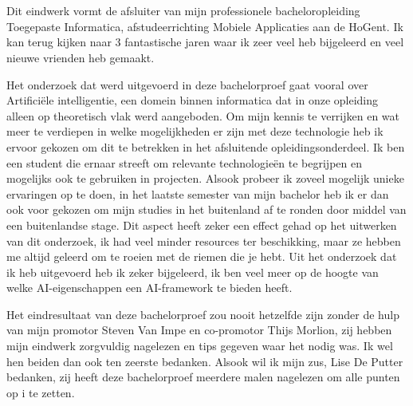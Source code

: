 
\chapter*{}
\label{ch:voorwoord}

Dit eindwerk vormt de afsluiter van mijn professionele bacheloropleiding Toegepaste Informatica, afstudeerrichting Mobiele Applicaties aan de HoGent. Ik kan terug kijken naar 3 fantastische jaren waar ik zeer veel heb bijgeleerd en veel nieuwe vrienden heb gemaakt.

Het onderzoek dat werd uitgevoerd in deze bachelorproef gaat vooral over Artificiële intelligentie, een domein binnen informatica dat in onze opleiding alleen op theoretisch vlak werd aangeboden. Om mijn kennis te verrijken en wat meer te verdiepen in welke mogelijkheden er zijn met deze technologie heb ik ervoor gekozen om dit te betrekken in het afsluitende opleidingsonderdeel. Ik ben een student die ernaar streeft om relevante technologieën te begrijpen en mogelijks ook te gebruiken in projecten. Alsook probeer ik zoveel mogelijk unieke ervaringen op te doen, in het laatste semester van mijn bachelor heb ik er dan ook voor gekozen om mijn studies in het buitenland af te ronden door middel van een buitenlandse stage. Dit aspect heeft zeker een effect gehad op het uitwerken van dit onderzoek, ik had veel minder resources ter beschikking, maar ze hebben me altijd geleerd om te roeien met de riemen die je hebt.
Uit het onderzoek dat ik heb uitgevoerd heb ik zeker bijgeleerd, ik ben veel meer op de hoogte van welke AI-eigenschappen een AI-framework te bieden heeft.

Het eindresultaat van deze bachelorproef zou nooit hetzelfde zijn zonder de hulp van mijn promotor Steven Van Impe en co-promotor Thijs Morlion, zij hebben mijn eindwerk zorgvuldig nagelezen en tips gegeven waar het nodig was. Ik wel hen beiden dan ook ten zeerste bedanken. Alsook wil ik mijn zus, Lise De Putter bedanken, zij heeft deze bachelorproef meerdere malen nagelezen om alle punten op i te zetten.

